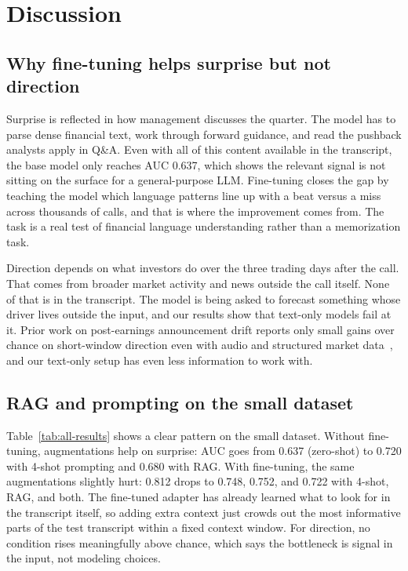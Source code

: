 \documentclass[11pt]{article}
\begin{document}
\section{Discussion}

\subsection{Why fine-tuning helps surprise but not direction}

Surprise is reflected in how management discusses the quarter. The
model has to parse dense financial text, work through forward
guidance, and read the pushback analysts apply in Q\&A. Even with
all of this content available in the transcript, the base model
only reaches AUC 0.637, which shows the relevant signal is not
sitting on the surface for a general-purpose LLM. Fine-tuning
closes the gap by teaching the model which language patterns line
up with a beat versus a miss across thousands of calls, and that is
where the improvement comes from. The task is a real test of
financial language understanding rather than a memorization task.

Direction depends on what investors do over the three trading days
after the call. That comes from broader market activity and news
outside the call itself. None of that is in the transcript.
The model is being asked to forecast something whose driver lives
outside the input, and our results show that text-only models fail
at it. Prior work on post-earnings announcement drift reports only
small gains over chance on short-window direction even with audio
and structured market data~\citep{Qin2019,Sawhney2020}, and our
text-only setup has even less information to work with.

\subsection{RAG and prompting on the small dataset}

Table~\ref{tab:all-results} shows a clear pattern on the small
dataset. Without fine-tuning, augmentations help on surprise: AUC
goes from 0.637 (zero-shot) to 0.720 with 4-shot prompting and
0.680 with RAG. With fine-tuning, the same augmentations slightly
hurt: 0.812 drops to 0.748, 0.752, and 0.722 with 4-shot, RAG, and
both. The fine-tuned adapter has already learned what to look for
in the transcript itself, so adding extra context just crowds out
the most informative parts of the test transcript within a fixed
context window. For direction, no condition rises meaningfully
above chance, which says the bottleneck is signal in the input,
not modeling choices.
\end{document}

